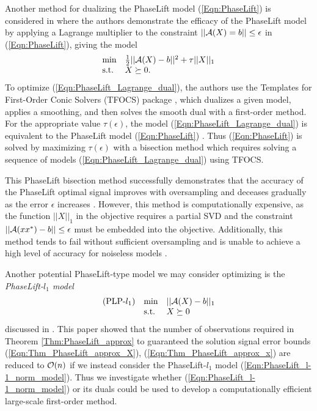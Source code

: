 Another method for dualizing the PhaseLift model (\ref{Eqn:PhaseLift}) is considered in \cite{candes2013phaselift} where the authors demonstrate the efficacy of the PhaseLift model by applying a Lagrange multiplier to the constraint $||{\mathcal A}(X)=b|| \leq \epsilon$ in (\ref{Eqn:PhaseLift}), giving the model
\begin{equation}		\label{Eqn:PhaseLift_Lagrange_dual}
\begin{array}{ll}
	\min
		& \frac{1}{2}||{\mathcal A}(X) - b||^2 +\tau ||X||_1
			\\
	\textnormal{s.t.}
		&	X \succeq 0.
\end{array}
\end{equation}
To optimize (\ref{Eqn:PhaseLift_Lagrange_dual}), the authors use the Templates for First-Order Conic Solvers (TFOCS) package \cite{becker2011templates}, which dualizes a given model, applies a smoothing, and then solves the smooth dual with a first-order method.  
For the appropriate value $ \tau(\epsilon)$, the model (\ref{Eqn:PhaseLift_Lagrange_dual})  is equivalent to the PhaseLift model (\ref{Eqn:PhaseLift}) \cite[Section 28]{rockafellar1970convex}.  
Thus (\ref{Eqn:PhaseLift}) is solved by maximizing $\tau(\epsilon)$ with a bisection method which requires solving a sequence of models (\ref{Eqn:PhaseLift_Lagrange_dual}) using TFOCS.


This PhaseLift bisection method successfully demonstrates that the accuracy of the PhaseLift optimal signal improves with oversampling and deceases gradually as the error $\epsilon$ increases \cite[Section 7]{candes2013phaselift}.  However, this method is computationally expensive, as the function $||X||_1$ in the objective requires a partial SVD and the constraint $||{\mathcal A}(xx^*) - b|| \leq \epsilon$ must be embedded into the objective.  Additionally, this method tends to fail without sufficient oversampling and is unable to achieve a high level of accuracy for noiseless models \cite[Section 5, Table 1]{DBLP:journals/siamsc/FriedlanderM16}.


Another potential PhaseLift-type model we may consider optimizing is the \textit{PhaseLift-$l_1$ model}
\begin{equation} 			\label{Eqn:PhaseLift_l-1_norm_model}
\begin{array}{lll}
(\textnormal{PLP-}l_1)	
&	\min
		& ||{\mathcal A}(X) - b||_1
			\\
&	\textnormal{s.t.}
		&	X \succeq 0
\end{array}
\end{equation}
discussed in \cite{candes2014solving}.  
This paper showed that the number of observations required in Theorem \ref{Thm:PhaseLift_approx} to guaranteed the solution signal error bounds (\ref{Eqn:Thm_PhaseLift_approx_X}), (\ref{Eqn:Thm_PhaseLift_approx_x}) are reduced to ${\mathcal O}(n)$ if we instead consider the PhaseLift-$l_1$ model (\ref{Eqn:PhaseLift_l-1_norm_model}).
Thus we investigate whether (\ref{Eqn:PhaseLift_l-1_norm_model}) or its duals could be used to develop a computationally efficient large-scale first-order method.


